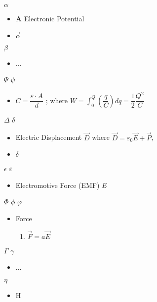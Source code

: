 
 $\alpha$\begin{itemize}
	\item {$\mathbf{A}$ Electronic Potential} %
	\item {$\vec{\alpha}$ } %
\end{itemize}

 $\beta$\begin{itemize}
	\item ...
\end{itemize}

 $\Psi$ $\psi$\begin{itemize}
	\item $C = \dfrac{\varepsilon·A}{d}$ %
	; where $W = \int_0^Q(\dfrac{q}{C})dq = \dfrac{1}{2} \dfrac{Q^2}{C}$ %
\end{itemize}

 $\Delta$ $\delta$\begin{itemize}
	\item Electric Displacement $\vec{D}$ %
		where  $\vec{D}=\varepsilon_0 \vec{E} + \vec{P}$, %
	\item $\delta$ %
\end{itemize}

 $\epsilon$ $\varepsilon$\begin{itemize}
	\item Electromotive Force (EMF) $E$ %
\end{itemize}

 $\Phi$ $\phi$ $\varphi$
\begin{itemize}
	\item Force
	\begin{enumerate}
		\item $\vec F = a \vec E$ %
	\end{enumerate}
\end{itemize}

 $\Gamma$ $\gamma$\begin{itemize}
	\item ...
\end{itemize}

 $\eta$\begin{itemize}
	\item H %
\end{itemize}

